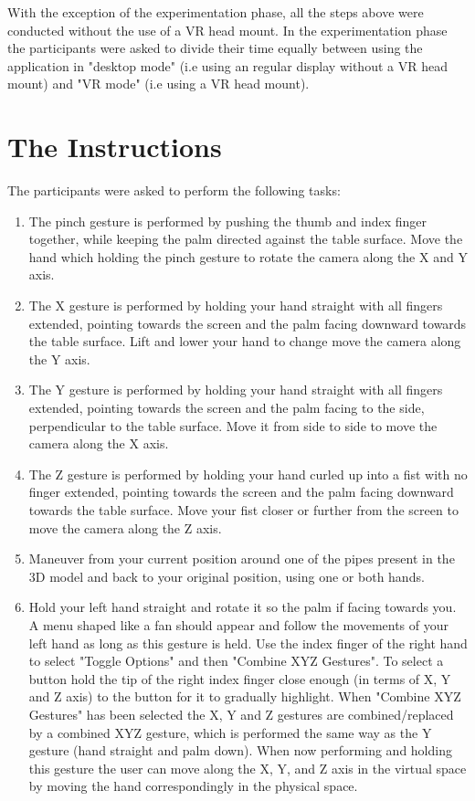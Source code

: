 With the exception of the experimentation phase, all the steps above were conducted without the use of a VR head mount. In the experimentation phase
the participants were asked to divide their time equally between using the application in "desktop mode" (i.e using an regular display without a VR head mount) and
"VR mode" (i.e using a VR head mount). 

\section{The Instructions}
The participants were asked to perform the following tasks:

\begin{enumerate}
    \item The pinch gesture is performed by pushing the thumb and index finger together, while keeping the palm directed against the table surface. 
          Move the hand which holding the pinch gesture to rotate the camera along the X and Y axis.
    
    \item The X gesture is performed by holding your hand straight with all fingers extended, pointing towards the screen and the palm facing downward towards the table surface. 
          Lift and lower your hand to change move the camera along the Y axis. 
    
    \item The Y gesture is performed by holding your hand straight with all fingers extended, pointing towards the screen and the palm facing to the side, 
          perpendicular to the table surface. 
          Move it from side to side to move the camera along the X axis.
    
    \item The Z gesture is performed by holding your hand curled up into a fist with no finger extended, pointing towards the screen and the palm facing downward towards the table surface. 
          Move your fist closer or further from the screen to move the camera along the Z axis. 
    
    \item Maneuver from your current position around one of the pipes present in the 3D model and back to your original position, using one or both hands. 
    
    \item Hold your left hand straight and rotate it so the palm if facing towards you. A menu shaped like a fan should appear and follow the movements of your left hand as long as
          this gesture is held. Use the index finger of the right hand to select "Toggle Options" and then "Combine XYZ Gestures". 
          To select a button hold the tip of the right index finger close enough (in terms of X, Y and Z axis) to the button for it to gradually highlight. 
          When "Combine XYZ Gestures" has been selected the X, Y and Z gestures are combined/replaced by a combined XYZ gesture, which is performed the same way as the Y gesture
          (hand straight and palm down). When now performing and holding this gesture the user can move along the X, Y, and Z axis in the virtual space by moving the hand 
          correspondingly in the physical space.


\end{enumerate}
